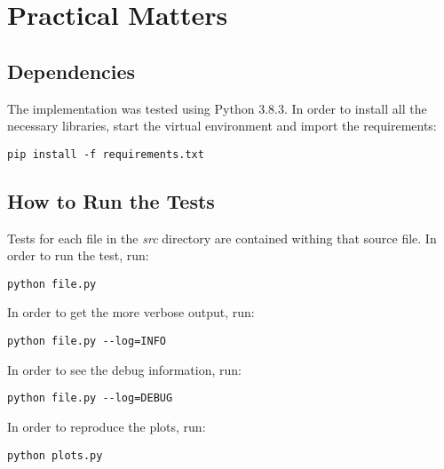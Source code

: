 \documentclass[main.tex]{subfiles}
\begin{document}
\chapter{Practical Matters}
\label{a_chap:practical}
\section*{Dependencies}
\label{sec:deps}
The implementation was tested using Python 3.8.3.
In order to install all the necessary libraries, start the virtual environment and import
the requirements:
\begin{verbatim}
pip install -f requirements.txt
\end{verbatim}

\section*{How to Run the Tests}
\label{sec:source_code_overview}
Tests for each file in the \emph{src} directory are contained withing that
source file. In order to run the test, run:
\begin{verbatim}
python file.py
\end{verbatim}
In order to get the more verbose output, run:
\begin{verbatim}
python file.py --log=INFO
\end{verbatim}
In order to see the debug information, run:
\begin{verbatim}
python file.py --log=DEBUG
\end{verbatim}
In order to reproduce the plots, run:
\begin{verbatim}
python plots.py
\end{verbatim}
\end{document}
